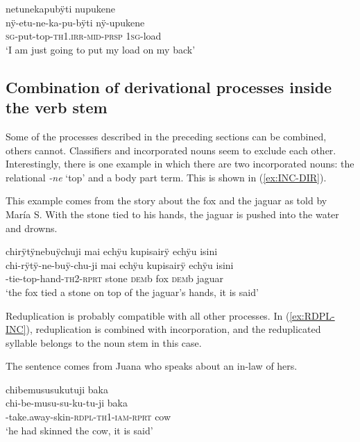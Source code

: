 \ea\label{ex:relational-verb-inc}
\begingl
\glpreamble netunekapubÿti nupukene\\
\gla nÿ-etu-ne-ka-pu-bÿti nÿ-upukene\\
\textsc{sg}-put-top-\textsc{th}1\textsc{.irr}-\textsc{mid}-\textsc{prsp} 1\textsc{sg}-load\\
\glft ‘I am just going to put my load on my back’
\endgl
\trailingcitation{[rxx-e181020le]}
\xe



\subsection{Combination of derivational processes inside the verb stem}%
\label{sec:ActiveVerbs_Combi}

Some of the processes described in the preceding sections can be combined, others cannot. Classifiers and incorporated nouns seem to exclude each other. Interestingly, there is one example in which there are two incorporated nouns: the relational \textit{-ne} ‘top’ and a body part term. This is shown in (\ref{ex:INC-DIR}).

This example comes from the story about the fox and the jaguar as told by María S. With the stone tied to his hands, the jaguar is pushed into the water and drowns.

\ea\label{ex:INC-DIR}
\begingl
\glpreamble chirÿtÿnebuÿchuji mai echÿu kupisairÿ echÿu isini\\
\gla chi-rÿtÿ-ne-buÿ-chu-ji mai echÿu kupisairÿ echÿu isini\\
-tie-top-hand-\textsc{th}2-\textsc{rprt} stone \textsc{dem}b fox \textsc{dem}b jaguar\\
\glft ‘the fox tied a stone on top of the jaguar’s hands, it is said’
\endgl
\trailingcitation{[rxx-n120511l-1.037]}
\xe

Reduplication is probably compatible with all other processes. In (\ref{ex:RDPL-INC}), reduplication is combined with incorporation, and the reduplicated syllable belongs to the noun stem in this case.

The sentence comes from Juana who speaks about an in-law of hers.

\ea\label{ex:RDPL-INC}
\begingl
\glpreamble chibemususukutuji baka\\
\gla chi-be-musu-su-ku-tu-ji baka\\
-take.away-skin-\textsc{rdpl}-\textsc{th}1-\textsc{iam}-\textsc{rprt} cow\\
\glft ‘he had skinned the cow, it is said’
\endgl
\trailingcitation{[jxx-p120430l-2.081]}
\xe
{}

